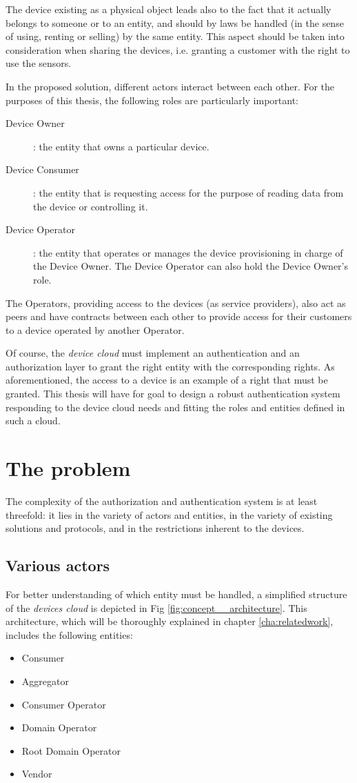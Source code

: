 The device existing as a physical object leads also to the fact that it actually belongs to someone or to an entity, and should by laws be handled (in the sense of using, renting or selling) by the same entity. This aspect should be taken into consideration when sharing the devices, i.e. granting a customer with the right to use the sensors.

In the proposed solution, different actors interact between each other. For the purposes of this thesis, the following roles are particularly important:

\begin{description}
	\item[Device Owner]: the entity that owns a particular device.
	\item[Device Consumer]: the entity that is requesting access for the purpose of reading data from the device or controlling it.
	\item[Device Operator]: the entity that operates or manages the device provisioning in charge of the Device Owner. The Device Operator can also hold the Device Owner's role.
\end{description}

The Operators, providing access to the devices (as service providers), also act as peers and have contracts between each other to provide access for their customers to a device operated by another Operator.

Of course, the \emph{device cloud} must implement an authentication and an authorization layer to grant the right entity with the corresponding rights. As aforementioned, the access to a device is an example of a right that must be granted. This thesis will have for goal to design a robust authentication system responding to the device cloud needs and fitting the roles and entities defined in such a cloud. 


\section{The problem}
The complexity of the authorization and authentication system is at least threefold: it lies in the variety of actors and entities, in the variety of existing solutions and protocols, and in the restrictions inherent to the devices.

\subsection{Various actors} 
For better understanding of which entity must be handled, a simplified structure of the \emph{devices cloud} is depicted in Fig \ref*{fig:concept__architecture}. This architecture, which will be thoroughly explained in chapter \ref{cha:relatedwork}, includes the following entities:
\begin{itemize}
	\item Consumer
	\item Aggregator
	\item Consumer Operator
	\item Domain Operator
	\item Root Domain Operator
	\item Vendor
\end{itemize}

